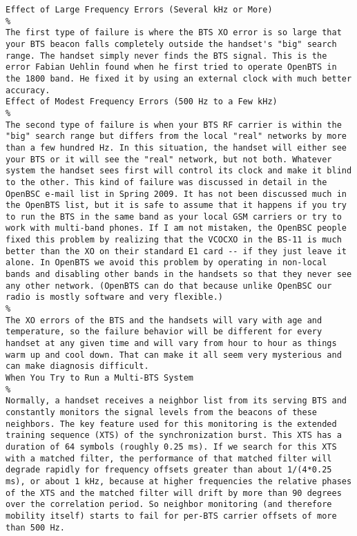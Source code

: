 {\begin{verbatim}
Effect of Large Frequency Errors (Several kHz or More) 
%
The first type of failure is where the BTS XO error is so large that your BTS beacon falls completely outside the handset's "big" search range. The handset simply never finds the BTS signal. This is the error Fabian Uehlin found when he first tried to operate OpenBTS in the 1800 band. He fixed it by using an external clock with much better accuracy.
Effect of Modest Frequency Errors (500 Hz to a Few kHz) 
%
The second type of failure is when your BTS RF carrier is within the "big" search range but differs from the local "real" networks by more than a few hundred Hz. In this situation, the handset will either see your BTS or it will see the "real" network, but not both. Whatever system the handset sees first will control its clock and make it blind to the other. This kind of failure was discussed in detail in the OpenBSC e-mail list in Spring 2009. It has not been discussed much in the OpenBTS list, but it is safe to assume that it happens if you try to run the BTS in the same band as your local GSM carriers or try to work with multi-band phones. If I am not mistaken, the OpenBSC people fixed this problem by realizing that the VCOCXO in the BS-11 is much better than the XO on their standard E1 card -- if they just leave it alone. In OpenBTS we avoid this problem by operating in non-local bands and disabling other bands in the handsets so that they never see any other network. (OpenBTS can do that because unlike OpenBSC our radio is mostly software and very flexible.)
%
The XO errors of the BTS and the handsets will vary with age and temperature, so the failure behavior will be different for every handset at any given time and will vary from hour to hour as things warm up and cool down. That can make it all seem very mysterious and can make diagnosis difficult.
When You Try to Run a Multi-BTS System 
%
Normally, a handset receives a neighbor list from its serving BTS and constantly monitors the signal levels from the beacons of these neighbors. The key feature used for this monitoring is the extended training sequence (XTS) of the synchronization burst. This XTS has a duration of 64 symbols (roughly 0.25 ms). If we search for this XTS with a matched filter, the performance of that matched filter will degrade rapidly for frequency offsets greater than about 1/(4*0.25 ms), or about 1 kHz, because at higher frequencies the relative phases of the XTS and the matched filter will drift by more than 90 degrees over the correlation period. So neighbor monitoring (and therefore mobility itself) starts to fail for per-BTS carrier offsets of more than 500 Hz.

\end{verbatim}}
